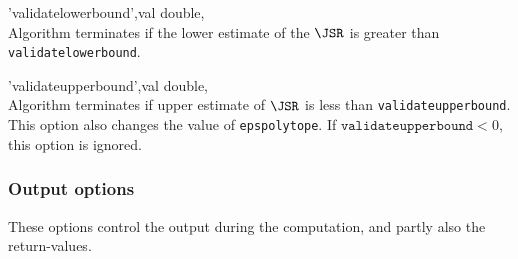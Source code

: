 \begin{param}
\item['validatelowerbound',val] double, \\Algorithm terminates if the lower estimate of the $\JSR$ is greater than \texttt{validatelowerbound}.

\item['validateupperbound',val] double, \\Algorithm terminates if upper estimate of $\JSR$ is less than \texttt{validateupperbound}. This option also changes the value of \texttt{epspolytope}. If $\texttt{validateupperbound}<0$, this option is ignored.

\end{param}

\subsubsection{Output options} These options control the output during the computation, and partly also the return-values.

